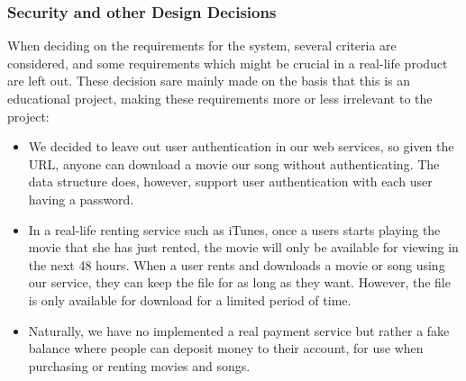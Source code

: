 \subsubsection{Security and other Design Decisions}
When deciding on the requirements for the system, several criteria are considered, and some requirements which might be crucial in a real-life product are left out. These decision sare mainly made on the basis that this is an educational project, making these requirements more or less irrelevant to the project:
\begin{itemize}
\item We decided to leave out user authentication in our web services, so given the URL, anyone can download a movie our song without authenticating. The data structure does, however, support user authentication with each user having a password.
\item In a real-life renting service such as iTunes, once a users starts playing the movie that she has just rented, the movie will only be available for viewing in the next 48 hours. When a user rents and downloads a movie or song using our service, they can keep the file for as long as they want. However, the file is only available for download for a limited period of time.
\item Naturally, we have no implemented a real payment service but rather a fake balance where people can deposit money to their account, for use when purchasing or renting movies and songs.
\end{itemize}